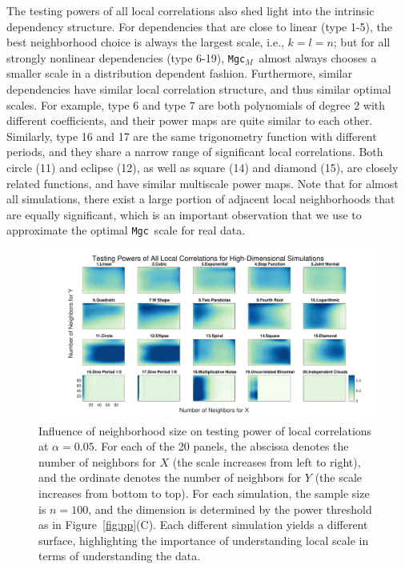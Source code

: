 \documentclass[11pt]{article}
\providecommand{\sct}[1]{{\sc \texttt{#1}}}
\newcommand{\Mgc}{\sct{Mgc}}
\newcommand{\Mgcm}{\sct{Mgc$_M$}}
\begin{document}
The testing powers of all local correlations also shed light into the intrinsic dependency structure. 
For dependencies that are close to linear (type 1-5), the best neighborhood choice is always the largest scale, i.e., $k=l=n$; but for all strongly nonlinear dependencies (type 6-19), \Mgcm~almost always chooses a smaller scale in a distribution dependent fashion. Furthermore, similar dependencies have similar local correlation structure, and thus similar optimal scales. For example, type 6 and type 7 are both polynomials of degree 2 with different coefficients, and their power maps are quite similar to each other. Similarly, type 16 and 17 are the same trigonometry function with different periods, and they share a narrow range of significant local correlations.
Both circle (11) and eclipse (12), as well as square (14) and diamond (15), are closely related functions, and have similar multiscale power maps. 
Note that for almost all simulations, there exist a large portion of adjacent local neighborhoods that are equally significant, which is an important observation that we use to approximate the optimal \Mgc~scale for real data.

\begin{figure}[htbp]
\includegraphics[width=1.0\textwidth]{Figures/FigHDHeat}
\caption{Influence of neighborhood size on testing power of local correlations at $\alpha=0.05$.
For each of the 20 panels, the abscissa denotes the number of neighbors for $X$ (the scale increases from left to right), and the ordinate denotes the number of neighbors for $Y$ (the scale increases from bottom to top). For each simulation, the sample size is $n=100$, and the dimension is determined by the power threshold as in Figure~\ref{fig:pp}(C). Each different simulation yields a different surface, highlighting the importance of understanding local scale in terms of understanding the data. }
\label{f:powermaps}
\end{figure}
\end{document}
